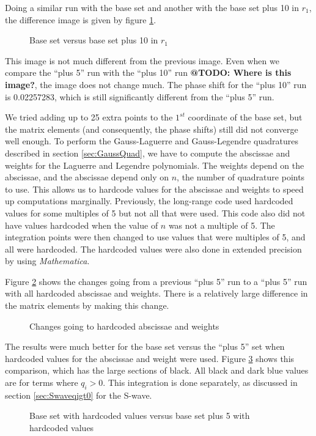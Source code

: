 \documentclass[Dissertation.tex]{subfiles}
\begin{document}
Doing a similar run with the base set and another with the base set plus 10 in $r_1$, the difference image is given by figure \ref{fig:BasevsBaseplus10}.
\begin{figure}[H]
	\centering
	\caption{Base set versus base set plus 10 in $r_1$}
	\label{fig:BasevsBaseplus10}
\end{figure}
\noindent This image is not much different from the previous image. Even when we compare the ``plus 5'' run with the ``plus 10'' run \textbf{@TODO: Where is this image?}, the image does not change much. The phase shift for the ``plus 10'' run is 0.02257283, which is still significantly different from the ``plus 5'' run.

We tried adding up to 25 extra points to the $1^{st}$ coordinate of the base set, but the matrix elements (and consequently, the phase shifts) still did not converge well enough. To perform the Gauss-Laguerre and Gauss-Legendre quadratures described in section \ref{sec:GaussQuad}, we have to compute the abscissae and weights for the Laguerre and Legendre polynomials. The weights depend on the abscissae, and the abscissae depend only on $n$, the number of quadrature points to use. This allows us to hardcode values for the abscissae and weights to speed up computations marginally. Previously, the long-range code used hardcoded values for some multiples of 5 but not all that were used. This code also did not have values hardcoded when the value of $n$ was not a multiple of 5. The integration points were then changed to use values that were multiples of 5, and all were hardcoded. The hardcoded values were also done in extended precision by using \emph{Mathematica}.

Figure \ref{fig:Base5vsBase5hardcoderound} shows the changes going from a previous ``plus 5'' run to a ``plus 5'' run with all hardcoded abscissae and weights. There is a relatively large difference in the matrix elements by making this change.
\begin{figure}[H]
	\centering
	\caption{Changes going to hardcoded abscissae and weights}
	\label{fig:Base5vsBase5hardcoderound}
\end{figure}

The results were much better for the base set versus the ``plus 5'' set when hardcoded values for the abscissae and weight were used. Figure \ref{fig:BasehardcodevsBase5hardcode} shows this comparison, which has the large sections of black. All black and dark blue values are for terms where $q_i > 0$. This integration is done separately, as discussed in section \ref{sec:Swaveqigt0} for the S-wave.
\begin{figure}[H]
	\centering
	\caption[Base set with hardcoded values vs. base set plus 5 with hardcoded values]{Base set with hardcoded values versus base set plus 5 with hardcoded values}
	\label{fig:BasehardcodevsBase5hardcode}
\end{figure}
\end{document}
